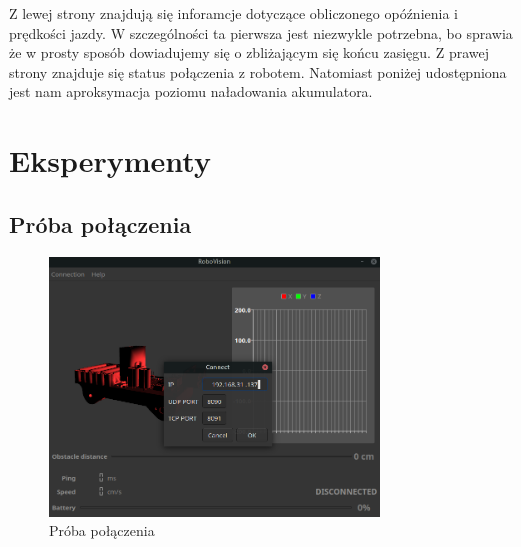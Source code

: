 \documentclass[12pt,a4paper,polish]{article}
\begin{document}
  Z lewej strony znajdują się inforamcje dotyczące obliczonego opóźnienia i
  prędkości jazdy. W szczególności ta pierwsza jest niezwykle potrzebna, bo
  sprawia że w prosty sposób dowiadujemy się o zbliżającym się końcu zasięgu.
  Z prawej strony znajduje się status połączenia z robotem. Natomiast poniżej
  udostępniona jest nam aproksymacja poziomu naładowania akumulatora.

  \section{Eksperymenty}

  \subsection{Próba połączenia}

  \begin{figure}[h]
    \centering
    \includegraphics[width=0.78\textwidth]{img/final/0.png}
    \caption{Próba połączenia}
  \end{figure}

  \newpage
\end{document}
